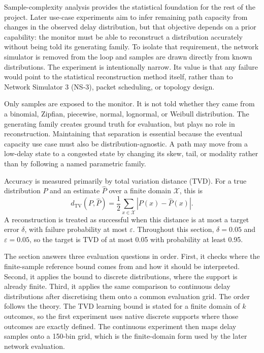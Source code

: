 \documentclass[a4paper,11pt]{report}
\begin{document}
Sample-complexity analysis provides the statistical foundation for the rest of the project. Later use-case experiments aim to infer remaining path capacity from changes in the observed delay distribution, but that objective depends on a prior capability: the monitor must be able to reconstruct a distribution accurately without being told its generating family. To isolate that requirement, the network simulator is removed from the loop and samples are drawn directly from known distributions. The experiment is intentionally narrow. Its value is that any failure would point to the statistical reconstruction method itself, rather than to Network Simulator 3 (NS-3), packet scheduling, or topology design.

Only samples are exposed to the monitor. It is not told whether they came from a binomial, Zipfian, piecewise, normal, lognormal, or Weibull distribution. The generating family creates ground truth for evaluation, but plays no role in reconstruction. Maintaining that separation is essential because the eventual capacity use case must also be distribution-agnostic. A path may move from a low-delay state to a congested state by changing its skew, tail, or modality rather than by following a named parametric family.

Accuracy is measured primarily by total variation distance (TVD). For a true distribution \(P\) and an estimate \(\widehat{P}\) over a finite domain \(\mathcal{X}\), this is
\[
d_{\mathrm{TV}}(P,\widehat{P}) =
\frac{1}{2}\sum_{x \in \mathcal{X}} |P(x)-\widehat{P}(x)|.
\]
A reconstruction is treated as successful when this distance is at most a target error \(\delta\), with failure probability at most \(\varepsilon\). Throughout this section, \(\delta=0.05\) and \(\varepsilon=0.05\), so the target is TVD of at most 0.05 with probability at least 0.95.

The section answers three evaluation questions in order. First, it checks where the finite-sample reference bound comes from and how it should be interpreted. Second, it applies the bound to discrete distributions, where the support is already finite. Third, it applies the same comparison to continuous delay distributions after discretising them onto a common evaluation grid. The order follows the theory. The TVD learning bound is stated for a finite domain of \(k\) outcomes, so the first experiment uses native discrete supports where those outcomes are exactly defined. The continuous experiment then maps delay samples onto a 150-bin grid, which is the finite-domain form used by the later network evaluation.
\end{document}
